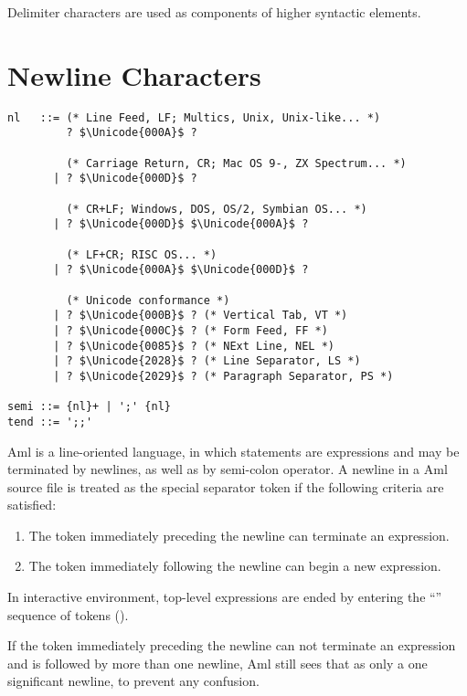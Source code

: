 Delimiter characters are used as components of higher syntactic elements. 





\section{Newline Characters}
\label{sec:newlinecharacters}

\syntax\begin{lstlisting}
nl   ::= (* Line Feed, LF; Multics, Unix, Unix-like... *)
         ? $\Unicode{000A}$ ? 
         
         (* Carriage Return, CR; Mac OS 9-, ZX Spectrum... *)
       | ? $\Unicode{000D}$ ? 
       
         (* CR+LF; Windows, DOS, OS/2, Symbian OS... *)
       | ? $\Unicode{000D}$ $\Unicode{000A}$ ?
       
         (* LF+CR; RISC OS... *)
       | ? $\Unicode{000A}$ $\Unicode{000D}$ ?
       
         (* Unicode conformance *)
       | ? $\Unicode{000B}$ ? (* Vertical Tab, VT *)
       | ? $\Unicode{000C}$ ? (* Form Feed, FF *)
       | ? $\Unicode{0085}$ ? (* NExt Line, NEL *)
       | ? $\Unicode{2028}$ ? (* Line Separator, LS *)
       | ? $\Unicode{2029}$ ? (* Paragraph Separator, PS *)
       
semi ::= {nl}+ | ';' {nl}
tend ::= ';;'
\end{lstlisting}

Aml is a line-oriented language, in which statements are expressions and may be terminated by newlines, as well as by semi-colon operator. A newline in a Aml source file is treated as the special separator token \lstinline@nl@ if the following criteria are satisfied:

\begin{enumerate}
  \item The token immediately preceding the newline can terminate an expression.
  \item The token immediately following the newline can begin a new expression. 
\end{enumerate}

In interactive environment, top-level expressions are ended by entering the ``\code{;;}'' sequence of tokens (). 

If the token immediately preceding the newline can not terminate an expression and is followed by more than one newline, Aml still sees that as only a one significant newline, to prevent any confusion.

